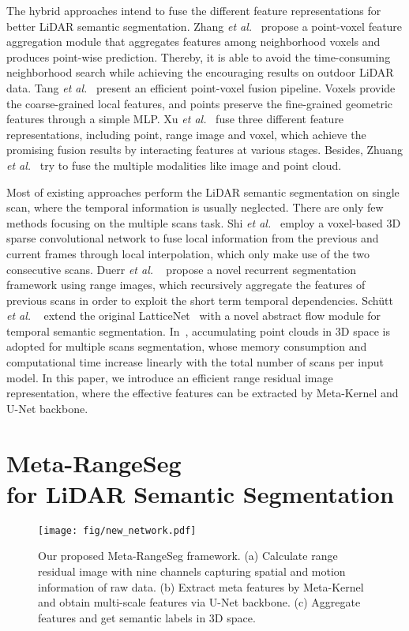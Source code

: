 \documentclass[letterpaper, 10 pt, journal, twoside]{ieeetran}
\begin{document}
The hybrid approaches intend to fuse the different feature representations for better LiDAR semantic segmentation. Zhang \textit{et al.}~\cite{zhang2020deep} propose a point-voxel feature aggregation module that aggregates features among neighborhood voxels and produces point-wise prediction. Thereby, it is able to avoid the time-consuming neighborhood search while achieving the encouraging results on outdoor LiDAR data. Tang \textit{et al.}~\cite{tang2020searching} present an efficient point-voxel fusion pipeline. Voxels provide the coarse-grained local features, and points preserve the fine-grained geometric features through a simple MLP. Xu \textit{et al.}~\cite{xu2021rpvnet} fuse three different feature representations, including point, range image and voxel, which achieve the promising fusion results by interacting features at various stages. 
Besides, Zhuang \textit{et al.}~\cite{zhuang2021perception} try to fuse the multiple modalities like image and point cloud.

Most of existing approaches perform the LiDAR semantic segmentation on single scan, where the temporal information is usually neglected. There are only few methods focusing on the multiple scans task. Shi \textit{et al.}~\cite{shi2020spsequencenet} employ a voxel-based 3D sparse convolutional network to fuse local information from the previous and current frames through local interpolation, which only make use of the two consecutive scans. Duerr \textit{et al.} ~\cite{duerr2020lidar} propose a novel recurrent segmentation framework using range images, which recursively aggregate the features of previous scans in order to exploit the short term temporal dependencies. 
Schütt \textit{et al.} ~\cite{schutt2022abstract} extend the original LatticeNet~\cite{rosu2019latticenet} with a novel abstract flow module for temporal semantic segmentation.
In~\cite{zhu2021cylindrical}, accumulating point clouds in 3D space is adopted for multiple scans segmentation, whose memory consumption and computational time increase linearly with the total number of scans per input model. In this paper, we introduce an efficient range residual image representation, where the effective features can be extracted by Meta-Kernel and U-Net backbone.


\section{Meta-RangeSeg \\ for LiDAR Semantic Segmentation}
\begin{figure*}
\centering
\setlength{\abovecaptionskip}{-0.2cm}
\texttt{[image: fig/new\_network.pdf]}
    \caption{Our proposed Meta-RangeSeg framework. (a) Calculate range residual image with nine channels capturing spatial and motion information of raw data. (b) Extract meta features by Meta-Kernel and obtain multi-scale features via U-Net backbone.
    (c) Aggregate features and get semantic labels in 3D space.}
    \label{fig:second}
    \vspace{-4mm}
\end{figure*}
\end{document}
